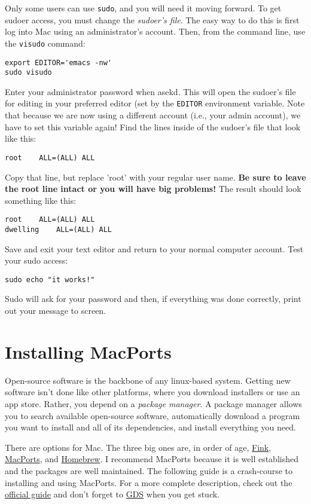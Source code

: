 \documentclass[12pt, letterpaper]{article}
\begin{document}
Only some users can use {\tt sudo}, and you will need it moving forward.  To
get sudoer access, you must change the \emph{sudoer's file}.  The easy way to
do this is first log into Mac using an administrator's account.  Then,
from the command line, use the {\tt visudo} command:
\begin{verbatim}
export EDITOR='emacs -nw'
sudo visudo
\end{verbatim}
Enter your administrator password when asekd.  This will open the sudoer's
file for editing in your preferred editor (set by the {\tt EDITOR} environment
variable.  Note that because we are now using a different account (i.e., your
admin account), we have to set this variable again!
Find the lines inside of the sudoer's file that look like this:
\begin{verbatim}
root    ALL=(ALL) ALL
\end{verbatim}
Copy that line, but replace 'root' with your regular user name.
\textbf{Be sure to leave the root line intact or you will have big problems!}
The result should look something like this:
\begin{verbatim}
root    ALL=(ALL) ALL
dwelling    ALL=(ALL) ALL
\end{verbatim}

Save and exit your text editor and return to your normal computer account.
Test your sudo access:
\begin{verbatim}
sudo echo "it works!"
\end{verbatim}
Sudo will ask for your password and then, if everything was done correctly,
print out your message to screen.

\section{Installing MacPorts}
\label{sec:ports}
Open-source software is the backbone of any linux-based system.  Getting new
software isn't done like other platforms, where you download installers or
use an app store.  Rather, you depend on a \emph{package manager}.  A
package manager allows you to search available open-source software,
automatically download a program you want to install and all of its
dependencies, and install everything you need.

There are options for Mac.  The three big ones are, in order of age,
\href{http://www.finkproject.org/}{Fink},
\href{https://www.macports.org/}{MacPorts}, and
\href{http://brew.sh/}{Homebrew}.
I recommend MacPorts because it is well established and the packages are
well maintained.  The following guide is a crash-course to installing and
using MacPorts.  For a more complete description, check out the
\href{https://guide.macports.org}{official guide} and don't forget to
\href{http://www.google.com}{GDS} when you get stuck.
\end{document}

